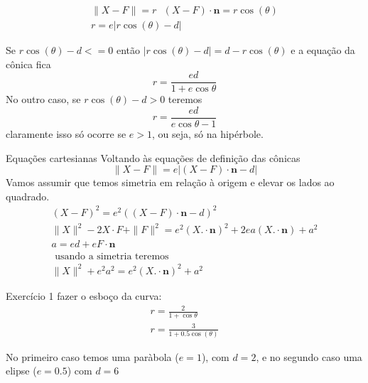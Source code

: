 \documentclass{beamer}
\begin{document}
    \begin{frame}{}
     \begin{gather*}
       \|X-F\| = r \text{ } (X-F)\cdot\mathbf{n} = r\cos(\theta)\\
       r= e|r\cos(\theta) - d|
     \end{gather*}
      
    \end{frame}
    \begin{frame}{}
      Se $r\cos(\theta)-d <=0 $ então $|r\cos(\theta)-d |=d -r\cos(\theta)$
      e a equação da cônica fica
      $$ r = \frac{ed}{1+e\cos{\theta}}$$
      No outro caso, se $r\cos(\theta)-d >0$ teremos
      $$ r= \frac{ed}{e\cos{\theta}-1}$$
      claramente isso só ocorre se $e>1$, ou seja,
      só na hipérbole. 
    \end{frame}
\begin{frame}
  
\end{frame}
\begin{frame}{Equações cartesianas} 
  Voltando às equações de definição das cônicas
  $$ \|X-F\| = e |(X-F)\cdot\mathbf{n}-d|$$ 
  Vamos assumir que temos simetria em relação à origem e elevar os lados ao quadrado.
  \begin{gather*}
    (X-F)^2 = e^2((X-F)\cdot\mathbf{n}-d)^2\\
    \|X\|^2 -2X\cdot F + \|F\|^2 = e^2(X.\cdot \mathbf{n})^2 + 2ea(X.\cdot \mathbf{n})
    + a^2\\
    a = ed + e F\cdot\mathbf{n}\\
    \text{ usando a simetria teremos} \\
    \|X\|^2 + e^2a^2 =e^2(X.\cdot \mathbf{n})^2+a^2
  \end{gather*}
\end{frame}

\begin{frame}{Exercício 1}
   fazer o esboço da curva:
   \begin{gather*}
     r= \frac{2}{1+\cos{\theta}} \\
     r = \frac{3}{1+0.5\cos(\theta)}
   \end{gather*}
  
\end{frame}
\begin{frame}
  No primeiro caso temos uma paràbola ($e=1$), com $d=2$, e no segundo caso uma elipse ($e=0.5$)
  com $d=6$
  
\end{frame}
\end{document}
